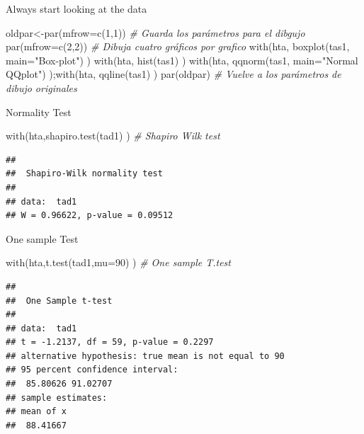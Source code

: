 \documentclass[
  ignorenonframetext,
]{beamer}
\newenvironment{Shaded}{\begin{snugshade}}{\end{snugshade}}
\newcommand{\AttributeTok}[1]{\textcolor[rgb]{0.77,0.63,0.00}{#1}}
\newcommand{\CommentTok}[1]{\textcolor[rgb]{0.56,0.35,0.01}{\textit{#1}}}
\newcommand{\DecValTok}[1]{\textcolor[rgb]{0.00,0.00,0.81}{#1}}
\newcommand{\FunctionTok}[1]{\textcolor[rgb]{0.00,0.00,0.00}{#1}}
\newcommand{\NormalTok}[1]{#1}
\newcommand{\OtherTok}[1]{\textcolor[rgb]{0.56,0.35,0.01}{#1}}
\newcommand{\StringTok}[1]{\textcolor[rgb]{0.31,0.60,0.02}{#1}}
\begin{document}
\begin{frame}[fragile]{Always start looking at the data}
\protect\hypertarget{always-start-looking-at-the-data}{}
\tiny

\begin{Shaded}
\begin{Highlighting}[]
\NormalTok{oldpar}\OtherTok{\textless{}{-}}\FunctionTok{par}\NormalTok{(}\AttributeTok{mfrow=}\FunctionTok{c}\NormalTok{(}\DecValTok{1}\NormalTok{,}\DecValTok{1}\NormalTok{)) }\CommentTok{\# Guarda los parámetros para el dibgujo}
\FunctionTok{par}\NormalTok{(}\AttributeTok{mfrow=}\FunctionTok{c}\NormalTok{(}\DecValTok{2}\NormalTok{,}\DecValTok{2}\NormalTok{)) }\CommentTok{\# Dibuja cuatro gráficos por grafico}
\FunctionTok{with}\NormalTok{(hta, }\FunctionTok{boxplot}\NormalTok{(tas1, }\AttributeTok{main=}\StringTok{"Box{-}plot"}\NormalTok{) )}
\FunctionTok{with}\NormalTok{(hta, }\FunctionTok{hist}\NormalTok{(tas1) )}
\FunctionTok{with}\NormalTok{(hta, }\FunctionTok{qqnorm}\NormalTok{(tas1, }\AttributeTok{main=}\StringTok{"Normal QQplot"}\NormalTok{) );}\FunctionTok{with}\NormalTok{(hta, }\FunctionTok{qqline}\NormalTok{(tas1) )}
\FunctionTok{par}\NormalTok{(oldpar) }\CommentTok{\# Vuelve a los parámetros de dibujo originales}
\end{Highlighting}
\end{Shaded}
\end{frame}

\begin{frame}[fragile]{Normality Test}
\protect\hypertarget{normality-test}{}
\small

\begin{Shaded}
\begin{Highlighting}[]
\FunctionTok{with}\NormalTok{(hta,}\FunctionTok{shapiro.test}\NormalTok{(tad1) ) }\CommentTok{\# Shapiro Wilk test}
\end{Highlighting}
\end{Shaded}

\begin{verbatim}
## 
##  Shapiro-Wilk normality test
## 
## data:  tad1
## W = 0.96622, p-value = 0.09512
\end{verbatim}
\end{frame}

\begin{frame}[fragile]{One sample Test}
\protect\hypertarget{one-sample-test}{}
\small

\begin{Shaded}
\begin{Highlighting}[]
\FunctionTok{with}\NormalTok{(hta,}\FunctionTok{t.test}\NormalTok{(tad1,}\AttributeTok{mu=}\DecValTok{90}\NormalTok{) ) }\CommentTok{\# One sample T.test}
\end{Highlighting}
\end{Shaded}

\begin{verbatim}
## 
##  One Sample t-test
## 
## data:  tad1
## t = -1.2137, df = 59, p-value = 0.2297
## alternative hypothesis: true mean is not equal to 90
## 95 percent confidence interval:
##  85.80626 91.02707
## sample estimates:
## mean of x 
##  88.41667
\end{verbatim}
\end{frame}
\end{document}
